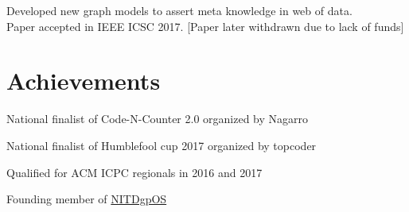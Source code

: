 \documentclass[letterpaper]{deedy-resume} %
\begin{document}
\begin{minipage}[t]{0.66\textwidth}
\sectionspace


Developed new graph models to assert meta knowledge in web of data. \\
Paper accepted in IEEE ICSC 2017. [Paper later withdrawn due to lack of funds]

\sectionspace


\section{Achievements}

\sectionspace

\begin{tightitemize}
\item National finalist of Code-N-Counter 2.0 organized by Nagarro\\
\item National finalist of Humblefool cup 2017 organized by topcoder\\
\item Qualified for ACM ICPC regionals in 2016 and 2017\\
\item Founding member of \href{https://github.com/NITDgpOS}{NITDgpOS}
\end{tightitemize}


\end{minipage} %
\end{document}
